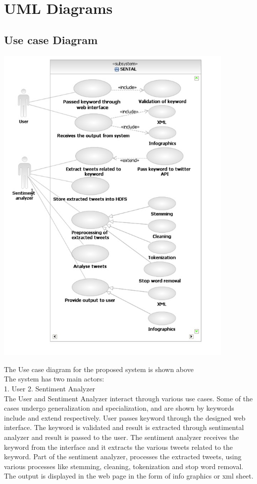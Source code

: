 \documentclass[a4paper,12pt]{report}
\begin{document}
\section {UML Diagrams}
\subsection{Use case Diagram}
\begin{center}
	\includegraphics[height=16cm]{images/usecase.jpg}
\end{center}
\hspace*{\parindent}The Use case diagram for the proposed system is shown above\\
\hspace*{\parindent} The system has two main actors:\\
\hspace*{\parindent} 1.  User   2. Sentiment Analyzer\\
\hspace*{\parindent} The User and Sentiment Analyzer interact through various use cases. Some of the cases undergo generalization and specialization, and are shown by keywords include and extend respectively.
User passes keyword through the designed web interface. The keyword is validated and result is extracted through sentimental analyzer and result is passed to the user. The sentiment analyzer receives the keyword from the interface and it extracts the various tweets related to the keyword. Part of the sentiment analyzer, processes the extracted tweets, using various processes like stemming, cleaning, tokenization and stop word removal. The output is displayed in the web page in the form of info graphics or xml sheet.
\end{document}
